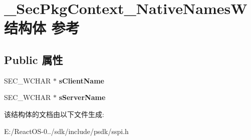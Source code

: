 \hypertarget{struct___sec_pkg_context___native_names_w}{}\section{\+\_\+\+Sec\+Pkg\+Context\+\_\+\+Native\+Names\+W结构体 参考}
\label{struct___sec_pkg_context___native_names_w}
\subsection*{Public 属性}
\begin{DoxyCompactItemize}
\item 
\mbox{\label{struct___sec_pkg_context___native_names_w_a30d6c8e1471156c1928ff94d9953dd97}} 
S\+E\+C\+\_\+\+W\+C\+H\+AR $\ast$ {\bfseries s\+Client\+Name}
\item 
\mbox{\label{struct___sec_pkg_context___native_names_w_a3e5b2f8c2a081f5bb83c57fcf00661f6}} 
S\+E\+C\+\_\+\+W\+C\+H\+AR $\ast$ {\bfseries s\+Server\+Name}
\end{DoxyCompactItemize}


该结构体的文档由以下文件生成\+:\begin{DoxyCompactItemize}
\item 
E\+:/\+React\+O\+S-\/0../sdk/include/psdk/sspi.\+h\end{DoxyCompactItemize}
